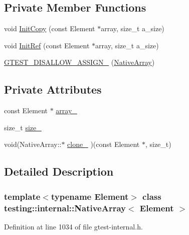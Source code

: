 \subsection*{Private Member Functions}
\begin{DoxyCompactItemize}
\item 
void \hyperlink{classtesting_1_1internal_1_1NativeArray_a8c0069cc09f559785fe4923fc118056f}{Init\+Copy} (const Element $\ast$array, size\+\_\+t a\+\_\+size)
\item 
void \hyperlink{classtesting_1_1internal_1_1NativeArray_ac6ad6d79e17e2c98a9d4d684afcb7f79}{Init\+Ref} (const Element $\ast$array, size\+\_\+t a\+\_\+size)
\item 
\hyperlink{classtesting_1_1internal_1_1NativeArray_a6633f3eab6947d4502fb1c69f95be66e}{G\+T\+E\+S\+T\+\_\+\+D\+I\+S\+A\+L\+L\+O\+W\+\_\+\+A\+S\+S\+I\+G\+N\+\_\+} (\hyperlink{classtesting_1_1internal_1_1NativeArray}{Native\+Array})
\end{DoxyCompactItemize}
\subsection*{Private Attributes}
\begin{DoxyCompactItemize}
\item 
const Element $\ast$ \hyperlink{classtesting_1_1internal_1_1NativeArray_adadc025fbbbd43904d4036991019f18f}{array\+\_\+}
\item 
size\+\_\+t \hyperlink{classtesting_1_1internal_1_1NativeArray_aa7e4251de39aaa75f697f0eaeedbf06e}{size\+\_\+}
\item 
void(Native\+Array\+::$\ast$ \hyperlink{classtesting_1_1internal_1_1NativeArray_addd7442a10398a60215a9989bcbd8078}{clone\+\_\+} )(const Element $\ast$, size\+\_\+t)
\end{DoxyCompactItemize}


\subsection{Detailed Description}
\subsubsection*{template$<$typename Element$>$\newline
class testing\+::internal\+::\+Native\+Array$<$ Element $>$}



Definition at line 1034 of file gtest-\/internal.\+h.



